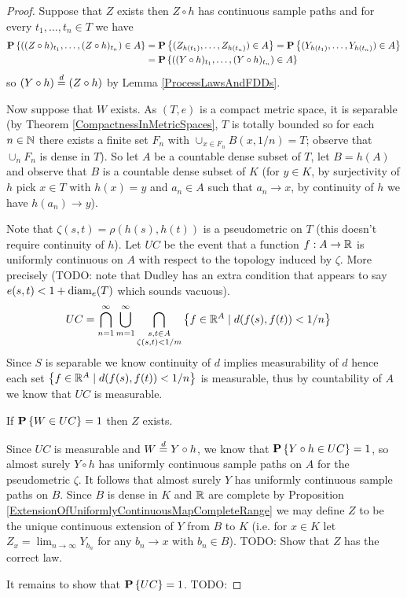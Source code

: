 \begin{proof}
Suppose that $Z$ exists then $Z \circ h$ has continuous sample paths and for every $t_1, \dotsc, t_n \in T$ we have 
\begin{align*}
\textbf{P}\left \{((Z \circ h)_{t_1}, \dotsc, (Z \circ h)_{t_n}) \in A \right \}  
&= \textbf{P}\left \{(Z_{h(t_1)}, \dotsc, Z_{h(t_n)}) \in A \right \} 
= \textbf{P}\left \{(Y_{h(t_1)}, \dotsc, Y_{h(t_n)}) \in A \right \} \\
&= \textbf{P}\left \{((Y \circ h)_{t_1}, \dotsc, (Y \circ h)_{t_n}) \in A \right \} 
\end{align*}
so $(Y \circ h) \overset{d}= (Z \circ h)$ by Lemma \ref{ProcessLawsAndFDDs}.  

Now suppose that $W$ exists.  As $(T,e)$ is a compact metric space, it is separable (by Theorem \ref{CompactnessInMetricSpaces}, $T$ is totally bounded so for each $n \in \mathbb{N}$ there exists a finite set $F_n$ with $\cup_{x \in F_n} B(x, 1/n) = T$; observe that $\cup_n F_n$ is dense in $T$).   So let $A$ be a countable dense subset of $T$, let $B = h(A)$ and observe that $B$ is a countable dense subset of $K$ (for $y \in K$, by surjectivity of $h$ pick $x \in T$ with $h(x) = y$ and $a_n \in A$ such that $a_n \to x$, by continuity of $h$ we have $h(a_n) \to y$).

Note that $\zeta(s,t) = \rho(h(s), h(t))$ is a pseudometric on $T$ (this doesn't require continuity of $h$).  Let $UC$ be the event that a function $f : A \to \mathbb{R}$ is uniformly continuous on $A$ with respect to the topology induced by $\zeta$.  More precisely (TODO: note that Dudley has an extra condition that appears to say $e(s,t) < 1 + \operatorname*{diam}_e(T)$ which sounds vacuous).  
\begin{align*}
UC &= \bigcap_{n=1}^\infty \bigcup_{m=1}^\infty \bigcap_{\substack{s,t \in A \\ \zeta(s,t) < 1/m }} \left \lbrace f \in \mathbb{R}^A   \mid d(f(s),f(t)) < 1/n \right \rbrace
\end{align*}
Since $S$ is separable we know continuity of $d$ implies measurability of $d$ hence each set $\left \lbrace f \in \mathbb{R}^A \mid  d(f(s), f(t)) < 1/n \right \rbrace$ is measurable, thus by countability of $A$ we know that $UC$ is measurable.

\begin{clm} If $\textbf{P}\left \{W \in UC \right \} = 1$ then $Z$ exists.
\end{clm}
Since $UC$ is measurable and $W \overset{d}= Y \circ h$, we know that $\textbf{P}\left \{Y \circ h \in UC \right \} = 1$, so almost surely $Y \circ h$ has uniformly continuous sample paths on $A$ for the pseudometric $\zeta$.  It follows that almost surely $Y$ has uniformly continuous sample paths on $B$.  Since $B$ is dense in $K$ and $\mathbb{R}$ are complete by Proposition \ref{ExtensionOfUniformlyContinuousMapCompleteRange} we may define $Z$ to be the unique continuous extension of $Y$ from $B$ to $K$ (i.e. for $x \in K$ let $Z_x = \lim_{n \to \infty} Y_{b_n}$ for any $b_n \to x$ with $b_n \in B$).  TODO: Show that $Z$ has the correct law.

It remains to show that $\textbf{P}\left \{UC \right \} = 1$.
TODO:
\end{proof}

